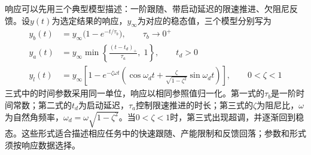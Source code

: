 响应可以先用三个典型模型描述：一阶跟随、带启动延迟的限速推进、欠阻尼反馈。设$y(t)$为选定结果的响应，$y_\infty$为对应的稳态值，三个模型分别写为
\begin{align}
y_{b}(t)&=y_{\infty}\bigl(1-e^{-t/\tau_{b}}\bigr),\qquad \tau_{b}\to 0^{+}\label{eq:resp-bit}\\[2pt]
y_{a}(t)&=y_{\infty}\min\left\{\frac{(t-t_{d})_{+}}{\tau_{a}},\;1\right\},\qquad t_{d}>0\label{eq:resp-atom}\\[2pt]
y_{l}(t)&=y_{\infty}\left[1-e^{-\zeta\omega t}\left(\cos\omega_{d}t+\frac{\zeta}{\sqrt{1-\zeta^{2}}}\sin\omega_{d}t\right)\right],\qquad 0<\zeta<1\label{eq:resp-life}
\end{align}
三式中的时间参数采用同一单位，响应以相同参照值归一化。第一式的$\tau_b$是一阶时间常数；第二式的$t_d$为启动延迟，$\tau_a$控制限速推进的时长；第三式的$\zeta$为阻尼比，$\omega$为自然角频率，$\omega_d=\omega\sqrt{1-\zeta^2}$。当$0<\zeta<1$时，第三式出现超调，并逐渐回到稳态。这些形式适合描述相应任务中的快速跟随、产能限制和反馈回落；参数和形式须按响应数据选择。

